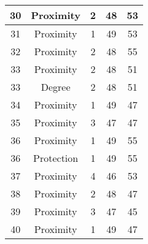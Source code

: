 \documentclass[results.tex]{subfiles}
\begin{document}
\begin{center}
\begin{tabular}{| c || c | c | c | c |}
            \hline
            30                      & Proximity                    & 2                      & 48                      & 53                   \\
            \hline
            31                      & Proximity                    & 1                      & 49                      & 53                   \\
            \hline
            32                      & Proximity                    & 2                      & 48                      & 55                   \\
            \hline
            33                      & Proximity                    & 2                      & 48                      & 51                   \\
            \hline
            33                      & Degree                       & 2                      & 48                      & 51                   \\
            \hline
            34                      & Proximity                    & 1                      & 49                      & 47                   \\
            \hline
            35                      & Proximity                    & 3                      & 47                      & 47                   \\
            \hline
            36                      & Proximity                    & 1                      & 49                      & 55                   \\
            \hline
            36                      & Protection                   & 1                      & 49                      & 55                   \\
            \hline
            37                      & Proximity                    & 4                      & 46                      & 53                   \\
            \hline
            38                      & Proximity                    & 2                      & 48                      & 47                   \\
            \hline
            39                      & Proximity                    & 3                      & 47                      & 45                   \\
            \hline
            40                      & Proximity                    & 1                      & 49                      & 47                   \\

\end{tabular}
\end{center}
\end{document}
